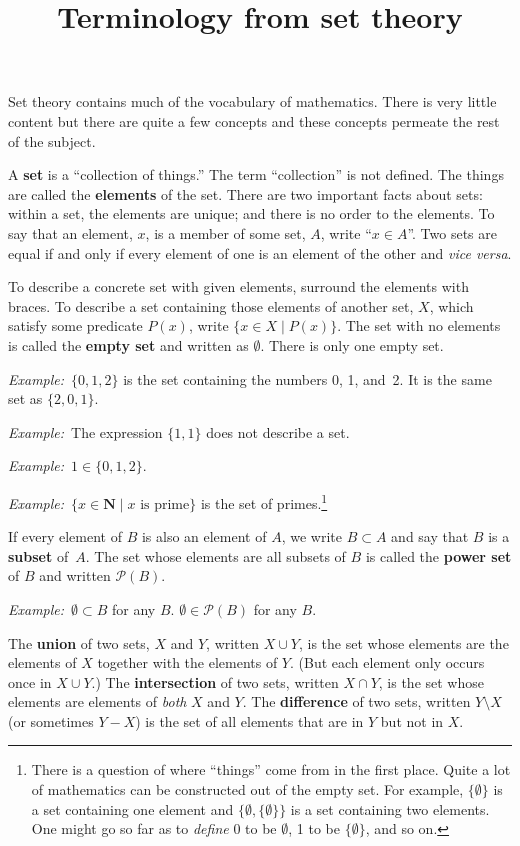 \documentclass[10pt, a4paper, twocolumn]{article}
\title{Terminology from set theory}
\author{}\date{}
\newcommand{\defn}[1]{\textbf{\textsf{#1}}}
\newcommand{\eg}{\emph{Example:}\relax}
\newcommand{\set}[1]{\mathbold{#1}}
\begin{document}
\maketitle
Set theory contains much of the vocabulary of mathematics. There is very little
content but there are quite a few concepts and these concepts permeate the rest
of the subject.

A \defn{set} is a “collection of things.” The term “collection” is not
defined. The things are called the \defn{elements} of the set. There are two
important facts about sets: within a set, the elements are unique; and there is
no order to the elements. To say that an element, $x$, is a member of some set,
$A$, write “$x \in A$”. Two sets are equal if and only if every element
of one is an element of the other and \emph{vice versa}. 

To describe a concrete set with given elements, surround the elements with
braces. To describe a set containing those elements of another set, $X$, which
satisfy some predicate $P(x)$, write $\{x \in X \mid P(x)\}$. The set with no
elements is called the \defn{empty set} and written as $\emptyset$. There is only one
empty set.

\eg\ $\{0, 1, 2\}$ is the set containing the numbers 0, 1, and~2. It is the same
set as $\{2,0,1\}$.

\eg\ The expression $\{1, 1\}$ does not describe a set.

\eg\ $1\in\{0,1,2\}$.

\eg\ $\{x \in \set{N} \mid \text{$x$ is prime}\}$ is the set of
primes.\footnote{There is a question of where “things” come from in
the first place. Quite a lot of mathematics can be constructed out of
the empty set. For example, $\{\emptyset\}$ is a set containing one element
and $\{\emptyset, \{\emptyset\}\}$ is a set containing two elements. One might go so
far as to \emph{define} 0 to be $\emptyset$, 1 to be $\{\emptyset\}$, and so on.}

If every element of $B$ is also an element of $A$, we write $B \subset A$
and say that $B$ is a \defn{subset} of~$A$. The set whose elements are
all subsets of $B$ is called the \defn{power set} of $B$ and written
$\mathcal{P}(B)$.

\eg\ $\emptyset \subset B$ for any $B$. $\emptyset \in \mathcal{P}(B)$ for any $B$.

The \defn{union} of two sets, $X$ and $Y$, written $X \cup Y$, is the set
whose elements are the elements of $X$ together with the elements of
$Y$. (But each element only occurs once in $X \cup Y$.) The
\defn{intersection} of two sets, written $X \cap Y$, is the set whose
elements are elements of \emph{both} $X$ and $Y$. The
\defn{difference} of two sets, written $Y \setminus X$ (or sometimes $Y-X$) is
the set of all elements that are in $Y$ but not in $X$.
\end{document}
